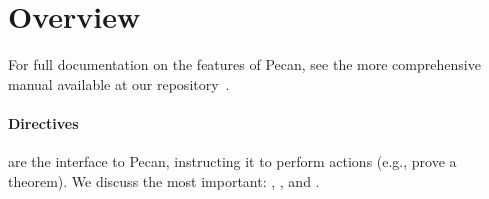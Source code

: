 \section{Overview}\label{sec:features}

For full documentation on the features of Pecan, see the more comprehensive manual available at our repository~\cite{pecan-repo}.




\paragraph{Directives} are the interface to Pecan, instructing it to perform actions (e.g., prove a theorem).
We discuss the most important: , , and .

